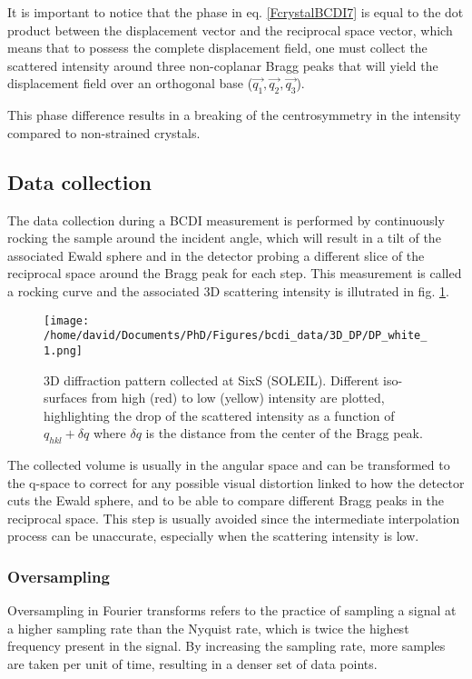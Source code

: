 It is important to notice that the phase in eq. \ref{FcrystalBCDI7} is equal to the dot product between the displacement vector and the reciprocal space vector, which means that to possess the complete displacement field, one must collect the scattered intensity around three non-coplanar Bragg peaks that will yield the displacement field over an orthogonal base ($\vec{q_1}, \vec{q_2}, \vec{q_3}$).

This phase difference results in a breaking of the centrosymmetry in the intensity compared to non-strained crystals.

\subsection{Data collection}

The data collection during a BCDI measurement is performed by continuously rocking the sample around the incident angle, which will result in a tilt of the associated Ewald sphere and in the detector probing a different slice of the reciprocal space around the Bragg peak for each step.
This measurement is called a rocking curve and the associated 3D scattering intensity is illutrated in fig. \ref{fig:3DDP}.

\begin{figure}[!htb]
    \centering
    \texttt{[image: /home/david/Documents/PhD/Figures/bcdi\_data/3D\_DP/DP\_white\_1.png]}
    \caption{
    3D diffraction pattern collected at SixS (SOLEIL).
    Different iso-surfaces from high (red) to low (yellow) intensity are plotted, highlighting the drop of the scattered intensity as a function of $q_{hkl}+\delta q$ where $\delta q$ is the distance from the center of the Bragg peak.
    }
    \label{fig:3DDP}
\end{figure}

The collected volume is usually in the angular space and can be transformed to the q-space to correct for any possible visual distortion linked to how the detector cuts the Ewald sphere, and to be able to compare different Bragg peaks in the reciprocal space.
This step is usually avoided since the intermediate interpolation process can be unaccurate, especially when the scattering intensity is low.

\subsubsection{Oversampling}
Oversampling in Fourier transforms refers to the practice of sampling a signal at a higher sampling rate than the Nyquist rate, which is twice the highest frequency present in the signal.
By increasing the sampling rate, more samples are taken per unit of time, resulting in a denser set of data points.

